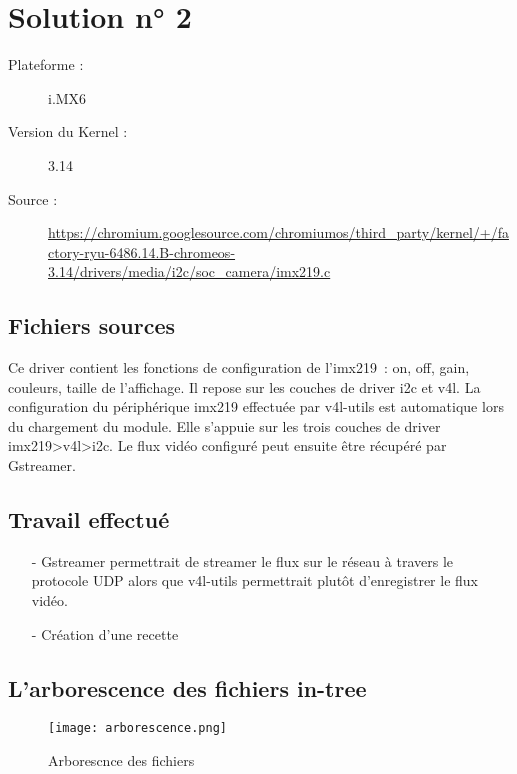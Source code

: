 
\chapter{Solution n° 2} %

\label{Chapter3} %

\begin{description}
  \item[Plateforme :] i.MX6
  \item[Version du Kernel :] 3.14
  \item[Source :] \href{https://chromium.googlesource.com/chromiumos/third_party/kernel/+/factory-ryu-6486.14.B-chromeos-3.14/drivers/media/i2c/soc_camera/imx219.c}
  {https://chromium.googlesource.com/chromiumos/third\_party/kernel/+/factory-ryu-6486.14.B-chromeos-3.14/drivers/media/i2c/soc\_camera/imx219.c} \\
\end{description}


\section{Fichiers sources}
Ce driver contient les fonctions de configuration de l’imx219 : on, off, gain,
couleurs, taille de l’affichage. Il repose sur les couches de driver i2c et v4l.
La configuration du périphérique imx219 effectuée par v4l-utils est automatique
lors du chargement du module. Elle s’appuie sur les trois couches de driver
imx219>v4l>i2c. Le flux vidéo configuré peut ensuite être récupéré par Gstreamer.

\section{Travail effectué}
\begin{itemize}
\item[-] Gstreamer permettrait de streamer le flux sur le réseau à travers le protocole
UDP alors que v4l-utils permettrait plutôt d’enregistrer le flux vidéo.
\item[-] Création d’une recette
\end{itemize}

\section{L’arborescence des fichiers in-tree}
\begin{figure}[th]
    \centering
    \texttt{[image: arborescence.png]}
    \decoRule
    \caption{Arborescnce des fichiers}  \label{fig:arbor}
\end{figure}

